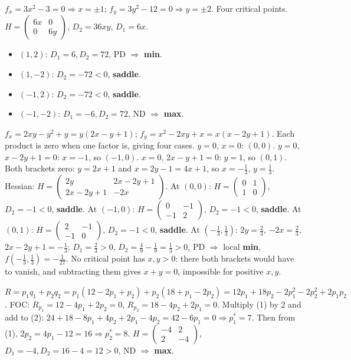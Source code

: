 \begin{solutions}
    \item $f_x = 3 x^2 - 3 = 0 \Rightarrow x = \pm 1$; $f_y = 3 y^2 - 12 = 0 \Rightarrow y = \pm 2$. Four critical points. $H = \begin{pmatrix} 6 x & 0 \\ 0 & 6 y \end{pmatrix}$, $D_2 = 36 x y$, $D_1 = 6 x$.
    \begin{itemize}
        \item $(1, 2)$: $D_1 = 6, D_2 = 72$, PD $\Rightarrow$ \textbf{min}.
        \item $(1, -2)$: $D_2 = -72 < 0$, \textbf{saddle}.
        \item $(-1, 2)$: $D_2 = -72 < 0$, \textbf{saddle}.
        \item $(-1, -2)$: $D_1 = -6, D_2 = 72$, ND $\Rightarrow$ \textbf{max}.
    \end{itemize}
    \item $f_x = 2 x y - y^2 + y = y(2 x - y + 1)$; $f_y = x^2 - 2 x y + x = x(x - 2 y + 1)$. Each product is zero when one factor is, giving four cases. $y = 0$, $x = 0$: $(0, 0)$. $y = 0$, $x - 2y + 1 = 0$: $x = -1$, so $(-1, 0)$. $x = 0$, $2x - y + 1 = 0$: $y = 1$, so $(0, 1)$. Both brackets zero: $y = 2x + 1$ and $x = 2y - 1 = 4x + 1$, so $x = -\tfrac13$, $y = \tfrac13$. Hessian: $H = \begin{pmatrix} 2 y & 2 x - 2 y + 1 \\ 2 x - 2 y + 1 & -2 x \end{pmatrix}$. At $(0,0)$: $H = \begin{pmatrix} 0 & 1 \\ 1 & 0 \end{pmatrix}$, $D_2 = -1 < 0$, \textbf{saddle}. At $(-1,0)$: $H = \begin{pmatrix} 0 & -1 \\ -1 & 2 \end{pmatrix}$, $D_2 = -1 < 0$, \textbf{saddle}. At $(0,1)$: $H = \begin{pmatrix} 2 & -1 \\ -1 & 0 \end{pmatrix}$, $D_2 = -1 < 0$, \textbf{saddle}. At $(-\tfrac13, \tfrac13)$: $2y = \tfrac23$, $-2x = \tfrac23$, $2x - 2y + 1 = -\tfrac13$; $D_1 = \tfrac23 > 0$, $D_2 = \tfrac49 - \tfrac19 = \tfrac13 > 0$, PD $\Rightarrow$ local \textbf{min}, $f(-\tfrac13, \tfrac13) = -\tfrac1{27}$. No critical point has $x, y > 0$: there both brackets would have to vanish, and subtracting them gives $x + y = 0$, impossible for positive $x, y$.
    \item $R = p_1 q_1 + p_2 q_2 = p_1(12 - 2 p_1 + p_2) + p_2(18 + p_1 - 2 p_2) = 12 p_1 + 18 p_2 - 2 p_1^2 - 2 p_2^2 + 2 p_1 p_2$. FOC: $R_{p_1} = 12 - 4 p_1 + 2 p_2 = 0$, $R_{p_2} = 18 - 4 p_2 + 2 p_1 = 0$. Multiply (1) by 2 and add to (2): $24 + 18 - 8 p_1 + 4 p_2 + 2 p_1 - 4 p_2 = 42 - 6 p_1 = 0 \Rightarrow p_1^* = 7$. Then from (1), $2 p_2 = 4 p_1 - 12 = 16 \Rightarrow p_2^* = 8$. $H = \begin{pmatrix} -4 & 2 \\ 2 & -4 \end{pmatrix}$, $D_1 = -4, D_2 = 16 - 4 = 12 > 0$, ND $\Rightarrow$ \textbf{max}.

\end{solutions}

